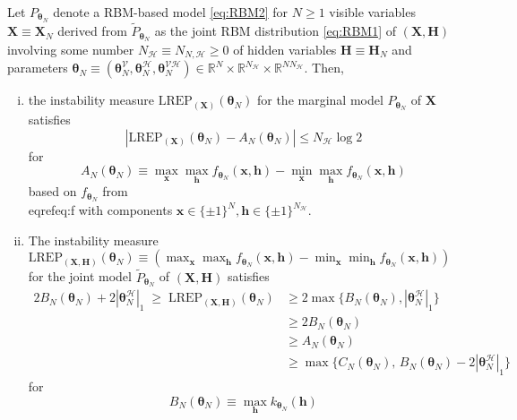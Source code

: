 \documentclass[]{article}
\theoremstyle{definition}
\newcommand{\REP}{\mathrm{LREP}}
\newcommand{\elt}{A_{N}(\boldsymbol \theta_N) }
\newcommand{\Gam}{B_{N}(\boldsymbol \theta_N) }
\newcommand{\Gamc}{C_{N}(\boldsymbol \theta_N) }
\begin{document}
\protect\hypertarget{prp:prop2}{}{\label{prp:prop2}}Let
\(P_{\boldsymbol \theta_N}\) denote a RBM-based model \eqref{eq:RBM2} for
\(N\geq 1\) visible variables \(\boldsymbol X \equiv \boldsymbol X_N\)
derived from \(\tilde{P}_{\boldsymbol \theta_N}\) as the joint RBM
distribution \eqref{eq:RBM1} of \((\boldsymbol X, \boldsymbol H)\)
involving some number \(N_{\mathcal{H}} \equiv N_{N,\mathcal{H}}\geq 0\)
of hidden variables \(\boldsymbol H \equiv \boldsymbol H_N\) and
parameters
\(\boldsymbol \theta_N \equiv (\boldsymbol \theta_N^{\mathcal{V}},\boldsymbol \theta_N^{\mathcal{H}}, \boldsymbol \theta_N^{\mathcal{VH}}) \in\mathbb{R}^{N}\times \mathbb{R}^{N_{\mathcal{H}}} \times \mathbb{R}^{N N_{\mathcal{H}}}\).
Then,
\begin{enumerate}[(i)]
\item the instability measure $\REP_{(\boldsymbol X)}(\boldsymbol \theta_N)$ for the marginal model $P_{\boldsymbol \theta_N}$ of  $\boldsymbol X$ satisfies
    $$
    \left| \REP_{(\boldsymbol X)}(\boldsymbol \theta_N)  - \elt\right| \leq    N_{\mathcal{H}}  \log 2
    $$
    for
    $$
    \elt  \equiv   \max_{ \boldsymbol x} \max_{ \boldsymbol h  } f_{\boldsymbol \theta_N} (\boldsymbol x, \boldsymbol h)-\min_{ \boldsymbol x } \max_{ \boldsymbol h }f_{\boldsymbol \theta_N} (\boldsymbol x, \boldsymbol h)
    $$
    based on $f_{\boldsymbol \theta_N}$ from \\eqref{eq:f} with components $\boldsymbol x \in \{\pm 1\}^{N}, \boldsymbol h \in \{\pm 1\}^{N_{\mathcal{H}}}$.
\item The instability measure $\REP_{(\boldsymbol X, \boldsymbol H)}(\boldsymbol \theta_N)\equiv \left(\max_{ \boldsymbol x} \max_{ \boldsymbol h  } f_{\boldsymbol \theta_N} (\boldsymbol x, \boldsymbol h)-\min_{ \boldsymbol x } \min_{ \boldsymbol h }f_{\boldsymbol \theta_N} (\boldsymbol x, \boldsymbol h)\right)$ for the joint model $\tilde{P}_{\boldsymbol \theta_N}$ of $(\boldsymbol X, \boldsymbol H)$ satisfies
    \begin{align*}
    2\Gam +  2|\boldsymbol \theta_N^{\mathcal{H}} |_{1} \; \geq \; \REP_{(\boldsymbol X, \boldsymbol H)}(\boldsymbol \theta_N)    & \geq 
    2\max\big\{\Gam,   |\boldsymbol \theta_N^{\mathcal{H}} |_{1}\big\} \\
    &\geq  2\Gam\\
    &\geq  \elt\\
    &\geq   \max\big\{  \Gamc, \, \Gam  - 2|\boldsymbol \theta_N^{\mathcal{H}} |_{1}  \big\}
    \end{align*}
    for
    $$
    \Gam \equiv \max_{ \boldsymbol h} k_{\boldsymbol \theta_N} (\boldsymbol h)
$$
\end{enumerate}
\end{document}
